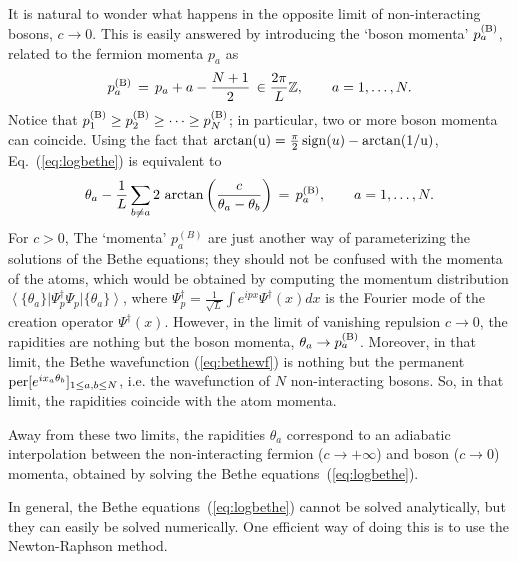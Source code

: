\documentclass[onecolumn,amsfonts,showpacs,superscriptaddress]{revtex4-1}
\begin{document}
It is natural to wonder what happens in the opposite limit of non-interacting bosons, $c \rightarrow 0$. This is easily answered by introducing the `boson momenta' $p^{({\rm B})}_a$, related to the fermion momenta $p_a$ as
\begin{equation}
    p^{({\rm B})}_a \, = \, p_a + a - \frac{N+1}{2} \, \in \frac{2\pi}{L} \mathbb{Z} , \qquad a=1,\dots, N.
\end{equation}
Notice that $p^{({\rm B})}_1 \geq p^{({\rm B})}_2  \geq  \dots \geq p^{({\rm B})}_N $; in particular, two or more boson momenta can coincide. Using the fact that ${\rm arctan(u)} = \frac{\pi}{2} \,{\rm sign}(u) - {\rm arctan(1/u)}$, Eq.~(\ref{eq:logbethe}) is equivalent to
\begin{equation}
    \label{eq:logbethe_bosons}
	\theta_a - \frac{1}{L} \sum_{b \neq a} 2~{\rm arctan} \left( \frac{c}{\theta_a - \theta_b} \right)  \, = \, p^{({\rm B})}_a , \qquad a=1,\dots, N.
\end{equation}
For $c>0$, The `momenta' $p_a^{(B)}$ are just another way of parameterizing the solutions of the Bethe equations; they should not be confused with the momenta of the atoms, which would be obtained by computing the momentum distribution $\left< \{ \theta_a \} \right| \Psi^\dagger_p \Psi_p \left| \{\theta_a \} \right>$, where $\Psi^\dagger_p = \frac{1}{\sqrt{L}} \int e^{i p x} \Psi^\dagger(x) dx$ is the Fourier mode of the creation operator $\Psi^\dagger(x)$. However, in the limit of vanishing repulsion $c \rightarrow 0$, the rapidities are nothing but the boson momenta, $\theta_a \rightarrow p^{({\rm B})}_a$. Moreover, in that limit, the Bethe wavefunction (\ref{eq:bethewf}) is nothing but the permanent ${\rm per} [e^{i x_a \theta_b}]_{1 \leq a,b \leq N}$, i.e. the wavefunction of $N$ non-interacting bosons. So, in that limit, the rapidities coincide with the atom momenta.


Away from these two limits, the rapidities $\theta_a$ correspond to an adiabatic interpolation between the non-interacting fermion ($c \rightarrow +\infty$) and boson ($c \rightarrow 0$) momenta, obtained by solving the Bethe equations~(\ref{eq:logbethe}). 


In general, the Bethe equations~(\ref{eq:logbethe}) cannot be solved analytically, but they can easily be solved numerically. One efficient way of doing this is to use the  Newton-Raphson method.
\end{document}

